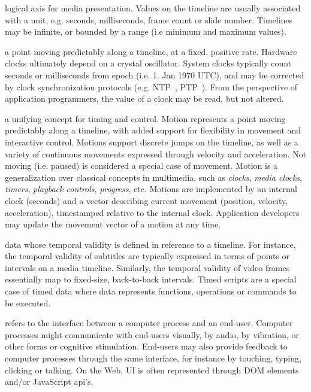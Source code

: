
 logical axis for media presentation. Values on the timeline are usually associated with a unit, e.g. seconds, milliseconds, frame count or slide number. Timelines may be infinite, or bounded by a range (i.e minimum and maximum values).

 a point moving predictably along a timeline, at a fixed, positive rate. Hardware clocks ultimately depend on a crystal oscillator. System clocks typically count seconds or milliseconds from epoch (i.e. 1. Jan 1970 UTC), and may be corrected by clock synchronization protocols (e.g. NTP~\cite{ntp}, PTP~\cite{ptp}). From the perspective of application programmers, the value of a clock may be read, but not altered.

 a unifying concept for timing and control. Motion represents a point moving predictably along a timeline, with added support for flexibility in movement and interactive control. Motions support discrete jumps on the timeline, as well as a variety of continuous movements expressed through velocity and acceleration. Not moving (i.e. paused) is considered a special case of movement. Motion is a generalization over classical concepts in multimedia, such as \emph{clocks}, \emph{media clocks}, \emph{timers}, \emph{playback controls}, \emph{progress}, etc. Motions are implemented by an internal clock (seconds) and a vector describing current movement (position, velocity, acceleration), timestamped relative to the internal clock. Application developers may update the movement vector of a motion at any time.

 data whose temporal validity is defined in reference to a timeline. For instance, the temporal validity of subtitles are typically expressed in terms of points or intervals on a media timeline. Similarly, the temporal validity of video frames essentially map to fixed-size, back-to-back intervals. Timed scripts are a special case of timed data where data represents functions, operations or commands to be executed.

 refers to the interface between a computer process and an end-user. Computer processes might communicate with end-users visually, by audio, by vibration, or other forms or cognitive stimulation. End-users may also provide feedback to computer processes through the same interface, for instance by touching, typing, clicking or talking. On the Web, UI is often represented through DOM elements and/or JavaScript api’s. 

